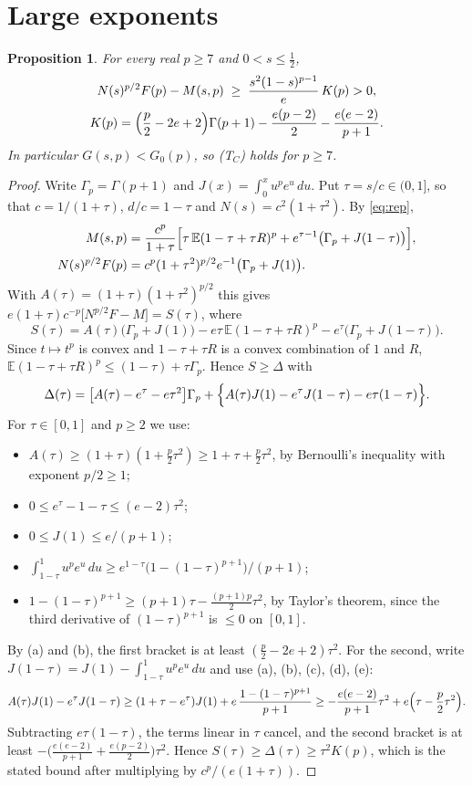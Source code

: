 \documentclass[11pt]{article}
\newtheorem{proposition}[theorem]{Proposition}
\theoremstyle{remark}
\newcommand{\E}{\mathbb E}
\begin{document}
\section{Large exponents}\label{sec:largep}
\begin{proposition}\label{prop:largep}
For every real $p\ge7$ and $0<s\le\frac12$,
\[
\begin{gathered}
N(s)^{p/2}F(p)-M(s,p)\;\ge\;\frac{s^2(1-s)^{p-1}}{e}\,K(p)>0,\\
K(p)=\Bigl(\frac p2-2e+2\Bigr)\Gamma(p+1)-\frac{e(p-2)}2-\frac{e(e-2)}{p+1}.
\end{gathered}
\]
In particular $G(s,p)<G_0(p)$, so (T$_C$) holds for $p\ge7$.
\end{proposition}
\begin{proof}
Write $\Gamma_p=\Gamma(p+1)$ and $J(x)=\int_0^xu^pe^u\,du$. Put $\tau=s/c\in(0,1]$, so that $c=1/(1+\tau)$, $d/c=1-\tau$ and $N(s)=c^2(1+\tau^2)$. By \eqref{eq:rep},
\[
\begin{aligned}
M(s,p)&=\frac{c^p}{1+\tau}\Bigl[\tau\,\E(1-\tau+\tau R)^p+e^{\tau-1}\bigl(\Gamma_p+J(1-\tau)\bigr)\Bigr],\\
N(s)^{p/2}F(p)&=c^p(1+\tau^2)^{p/2}e^{-1}\bigl(\Gamma_p+J(1)\bigr).
\end{aligned}
\]
With $A(\tau)=(1+\tau)(1+\tau^2)^{p/2}$ this gives $e(1+\tau)c^{-p}\bigl[N^{p/2}F-M\bigr]=S(\tau)$, where
\[
S(\tau)=A(\tau)\bigl(\Gamma_p+J(1)\bigr)-e\tau\,\E(1-\tau+\tau R)^p-e^\tau\bigl(\Gamma_p+J(1-\tau)\bigr).
\]
Since $t\mapsto t^p$ is convex and $1-\tau+\tau R$ is a convex combination of $1$ and $R$, $\E(1-\tau+\tau R)^p\le(1-\tau)+\tau\Gamma_p$. Hence $S\ge\Delta$ with
\[
\Delta(\tau)=\bigl[A(\tau)-e^\tau-e\tau^2\bigr]\Gamma_p+\Bigl\{A(\tau)J(1)-e^\tau J(1-\tau)-e\tau(1-\tau)\Bigr\}.
\]
For $\tau\in[0,1]$ and $p\ge2$ we use:
\begin{itemize}
\item[(a)] $A(\tau)\ge(1+\tau)(1+\frac p2\tau^2)\ge1+\tau+\frac p2\tau^2$, by Bernoulli's inequality with exponent $p/2\ge1$;
\item[(b)] $0\le e^\tau-1-\tau\le(e-2)\tau^2$;
\item[(c)] $0\le J(1)\le e/(p+1)$;
\item[(d)] $\int_{1-\tau}^1u^pe^u\,du\ge e^{1-\tau}\bigl(1-(1-\tau)^{p+1}\bigr)/(p+1)$;
\item[(e)] $1-(1-\tau)^{p+1}\ge(p+1)\tau-\frac{(p+1)p}2\tau^2$, by Taylor's theorem, since the third derivative of $(1-\tau)^{p+1}$ is $\le0$ on $[0,1]$.
\end{itemize}
By (a) and (b), the first bracket is at least $(\frac p2-2e+2)\tau^2$. For the second, write $J(1-\tau)=J(1)-\int_{1-\tau}^1u^pe^u\,du$ and use (a), (b), (c), (d), (e):
\[
A(\tau)J(1)-e^\tau J(1-\tau)\ge(1+\tau-e^\tau)J(1)+e\,\frac{1-(1-\tau)^{p+1}}{p+1}\ge-\frac{e(e-2)}{p+1}\tau^2+e\Bigl(\tau-\frac p2\tau^2\Bigr).
\]
Subtracting $e\tau(1-\tau)$, the terms linear in $\tau$ cancel, and the second bracket is at least $-\bigl(\frac{e(e-2)}{p+1}+\frac{e(p-2)}2\bigr)\tau^2$. Hence $S(\tau)\ge\Delta(\tau)\ge\tau^2K(p)$, which is the stated bound after multiplying by $c^p/(e(1+\tau))$.


\end{proof}
\end{document}
